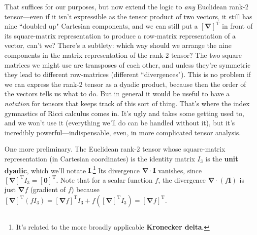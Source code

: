\documentclass[12pt]{article}
\renewcommand{\vv}[1]{\mathbf{#1}}
\newcommand{\del}{\boldsymbol{\nabla}}
\begin{document}
That suffices for our purposes, but now extend the logic to \emph{any} Euclidean rank-2 tensor---even if it isn't expressible as the tensor product of two vectors, it still has nine ``doubled up" Cartesian components, and we can still put a $[\del]^{\textrm{T}}$ in front of its square-matrix representation to produce a row-matrix representation of a vector, can't we? There's a subtlety: which way should we arrange the nine components in the matrix representation of the rank-2 tensor? The two square matrices we might use are transposes of each other, and unless they're symmetric they lead to different row-matrices (different ``divergences"). This is no problem if we can express the rank-2 tensor as a dyadic product, because then the order of the vectors tells us what to do. But in general it would be useful to have a \emph{notation} for tensors that keeps track of this sort of thing. That's where the index gymnastics of Ricci calculus comes in. It's ugly and takes some getting used to, and we won't use it (everything we'll do can be handled without it), but it's incredibly powerful---indispensable, even, in more complicated tensor analysis.

One more preliminary. The Euclidean rank-2 tensor whose square-matrix representation (in Cartesian coordinates) is the identity matrix $I_3$ is the \textbf{unit dyadic}, which we'll notate $\vv I$.\footnote{It's related to the more broadly applicable \textbf{Kronecker delta}.} Its divergence $\del \cdot \vv I$ vanishes, since $[\del]^{\textrm{T}}I_3 = [\vv 0]^{\textrm{T}}$. Note that for a scalar function $f$, the divergence $\del \cdot (f \vv I)$ is just $\del f$ (gradient of $f$) because $[\del]^{\textrm{T}}(f I_3) = [\del f]^{\textrm{T}} I_3 + f ([\del]^{\textrm{T}} I_3) = [\del f]^{\textrm{T}}$.
\end{document}
